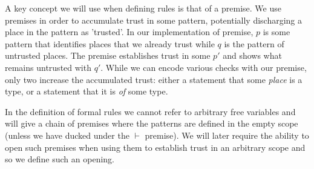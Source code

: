 A key concept we will use when defining rules is that of a premise. We use
premises in order to accumulate trust in some pattern, potentially discharging
a place in the pattern as 'trusted'. In our implementation of premise, $p$ is
some pattern that identifies places that we already trust while $q$ is the
pattern of untrusted places. The premise establishes trust in some $p'$ and
shows what remains untrusted with $q'$. While we can encode various checks with
our premise, only two increase the accumulated trust: either a statement that
some \emph{place} is a type, or a statement that it is \emph{of} some type.

In the definition of formal rules we cannot refer to arbitrary
free variables and will give a chain of premises where the patterns are defined
in the empty scope (unless we have ducked under the $\vdash$ premise). We will later
require the ability to open such premises when using them to establish trust in
an arbitrary scope and so we define such an opening.
